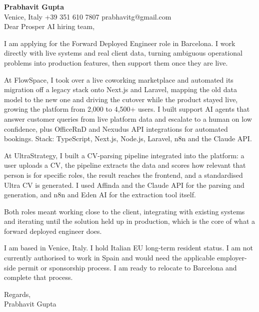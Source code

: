 \documentclass[a4paper,10.5pt]{article}
\begin{document}
\textbf{Prabhavit Gupta}\\
Venice, Italy \textbar{} +39 351 610 7807 \textbar{} prabhavitg@gmail.com\\[10pt]
Dear Prosper AI hiring team,

I am applying for the Forward Deployed Engineer role in Barcelona. I work directly with live systems and real client data, turning ambiguous operational problems into production features, then support them once they are live.

At FlowSpace, I took over a live coworking marketplace and automated its migration off a legacy stack onto Next.js and Laravel, mapping the old data model to the new one and driving the cutover while the product stayed live, growing the platform from 2,000 to 4,500+ users. I built support AI agents that answer customer queries from live platform data and escalate to a human on low confidence, plus OfficeRnD and Nexudus API integrations for automated bookings. Stack: TypeScript, Next.js, Node.js, Laravel, n8n and the Claude API.

At UltraStrategy, I built a CV-parsing pipeline integrated into the platform: a user uploads a CV, the pipeline extracts the data and scores how relevant that person is for specific roles, the result reaches the frontend, and a standardised Ultra CV is generated. I used Affinda and the Claude API for the parsing and generation, and n8n and Eden AI for the extraction tool itself.

Both roles meant working close to the client, integrating with existing systems and iterating until the solution held up in production, which is the core of what a forward deployed engineer does.

I am based in Venice, Italy. I hold Italian EU long-term resident status. I am not currently authorised to work in Spain and would need the applicable employer-side permit or sponsorship process. I am ready to relocate to Barcelona and complete that process.

Regards,\\
Prabhavit Gupta
\end{document}
